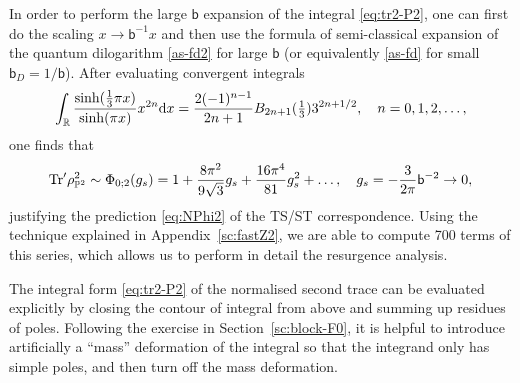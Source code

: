\documentclass[a4paper,11pt]{article}
\theoremstyle{definition}
\def\IR{{\mathbb R}}
\def\IP{{\mathbb P}}
\newcommand{\tr}{{\rm Tr}}
\newcommand{\re}{{\rm e}}
\newcommand{\ri}{{\rm i}}
\newcommand{\rd}{{\rm d}}
\newcommand{\bb}{\mathsf{b}}
\DeclareMathOperator{\Li}{Li}
\DeclareMathOperator{\imag}{Im}
\begin{document}
In order to perform the large $\bb$ expansion of the integral
\eqref{eq:tr2-P2}, one can first do the scaling
$x\rightarrow \bb^{-1}x$ and then use the formula of semi-classical
expansion of the quantum dilogarithm \eqref{as-fd2} for large $\bb$
(or equivalently \eqref{as-fd} for small $\bb_D = 1/\bb$).
After evaluating convergent integrals
\begin{equation}
  \int_{\IR} \frac{\sinh(\frac{1}{3}\pi x)}{\sinh(\pi x)} x^{2n}\rd x
  = \frac{2(-1)^{n-1}}{2n+1}B_{2n+1}(\tfrac{1}{3})3^{2n+1/2},
  \quad n=0,1,2,\ldots,
\end{equation}
one finds that
%
\begin{equation}
  \tr'\rho_{\IP^2}^2 \sim \Phi_{0;2}(g_s) = 1+ \frac{8\pi^2}{9\sqrt{3}}g_s +
  \frac{16\pi^4}{81}g_s^2 + \ldots,\quad
  g_s=-\frac{3}{2\pi}\bb^{-2}\rightarrow 0,
  \label{eq:tr2asymp-P2}
\end{equation}
justifying the prediction
\eqref{eq:NPhi2}
of the TS/ST correspondence.
Using the technique explained in Appendix~\ref{sc:fastZ2}, we are able to
compute 700 terms of this series, which allows us to perform in detail the resurgence
analysis.

The integral form \eqref{eq:tr2-P2} of the normalised second trace can
be evaluated explicitly by closing the contour of integral from above
and summing up residues of poles.  Following the exercise in
Section~\ref{sc:block-F0}, it is helpful to introduce artificially a
``mass'' deformation of the integral so that the integrand only has
simple poles, and then turn off the mass deformation.
\end{document}
